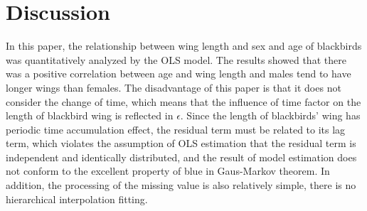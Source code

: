 \section{Discussion}

In this paper, the relationship between wing length and sex and age of blackbirds was quantitatively analyzed by the OLS model. The results showed that there was a positive correlation between age and wing length and males tend to have longer wings than females. The disadvantage of this paper is that it does not consider the change of time, which means that the influence of time factor on the length of blackbird wing is reflected in $\epsilon$. Since the length of blackbirds' wing has periodic time accumulation effect, the residual term must be related to its lag term, which violates the assumption of OLS estimation that the residual term is independent and identically distributed, and the result of model estimation does not conform to the excellent property of blue in Gaus-Markov theorem. In addition, the processing of the missing value is also relatively simple, there is no hierarchical interpolation fitting.
